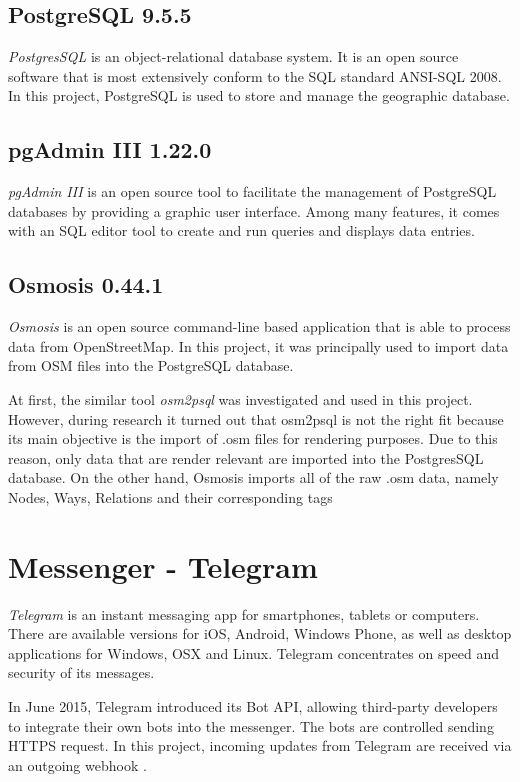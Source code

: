 \subsection{PostgreSQL 9.5.5}
\textit{PostgresSQL} \cite{postgres:about} is an object-relational database system. It is an open source software that is most extensively conform to the SQL standard ANSI-SQL 2008. In this project, PostgreSQL is used to store and manage the geographic database. 

\subsection{pgAdmin III 1.22.0}
\textit{pgAdmin III} \cite{pgadmin} is an open source tool to facilitate the management of PostgreSQL databases by providing a graphic user interface. Among many features, it comes with an SQL editor tool to create and run queries and displays data entries.

\subsection{Osmosis 0.44.1}
\textit{Osmosis} \cite{osmosis} is an open source command-line based application that is able to process data from OpenStreetMap. In this project, it was principally used to import data from OSM files into the PostgreSQL database. 

At first, the similar tool \textit{osm2psql} was investigated and used in this project. However, during research it turned out that osm2psql is not the right fit because its main objective is the import of .osm files for rendering purposes. Due to this reason, only data that are render relevant are imported into the PostgresSQL database. On the other hand, Osmosis imports all of the raw .osm data, namely Nodes, Ways, Relations and their corresponding tags \cite{osmosis:osm2psql}

\section{Messenger - Telegram}
\textit{Telegram} \cite{telegram:faq} is an instant messaging app for smartphones, tablets or computers. There are available versions for iOS, Android, Windows Phone, as well as desktop applications for Windows, OSX and Linux. Telegram concentrates on speed and security of its messages. 

In June 2015, Telegram introduced its Bot API, allowing third-party developers to integrate their own bots into the messenger. The bots are controlled sending HTTPS request. In this project, incoming updates from Telegram are received via an outgoing webhook \cite{telegram:updates}.

